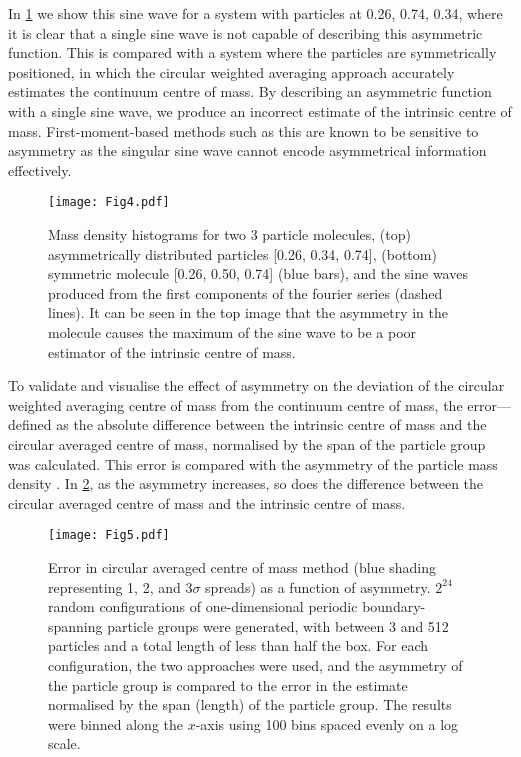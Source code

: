 \documentclass[reprint,superscriptaddress,nobibnotes,amsmath,amssymb,aip]{revtex4-2}
\begin{document}
In \cref{fig:sine_wave_assym} we show this sine wave for a system with particles at 0.26, 0.74, 0.34, where it is clear that a single sine wave is not capable of describing this asymmetric function. 
This is compared with a system where the particles are symmetrically positioned, in which the circular weighted averaging approach accurately estimates the continuum centre of mass. 
By describing an asymmetric function with a single sine wave, we produce an incorrect estimate of the intrinsic centre of mass. 
First-moment-based methods such as this are known to be sensitive to asymmetry \cite{teague_robust_2018} as the singular sine wave cannot encode asymmetrical information effectively. 
%
\begin{figure}
    \centering
    \texttt{[image: Fig4.pdf]}
    \caption{Mass density histograms for two 3 particle molecules, (top) asymmetrically distributed particles [0.26, 0.34, 0.74], (bottom) symmetric molecule [0.26, 0.50, 0.74] (blue bars), and the sine waves produced from the first components of the fourier series (dashed lines). It can be seen in the top image that the asymmetry in the molecule causes the maximum of the sine wave to be a poor estimator of the intrinsic centre of mass. }
    \label{fig:sine_wave_assym}
\end{figure}
%

To validate and visualise the effect of asymmetry on the deviation of the circular weighted averaging centre of mass from the continuum centre of mass, the error—defined as the absolute difference between the intrinsic centre of mass and the circular averaged centre of mass, normalised by the span of the particle group was calculated.
This error is compared with the asymmetry of the particle mass density \cite{xioajun_on_1991}. 
In \cref{fig:method_comparison}, as the asymmetry increases, so does the difference between the circular averaged centre of mass and the intrinsic centre of mass. 
%
\begin{figure}
    \centering
    \texttt{[image: Fig5.pdf]}
    \caption{Error in circular averaged centre of mass method (blue shading representing 1, 2, and 3$\sigma$ spreads) as a function of asymmetry.
    $2^{24}$ random configurations of one-dimensional periodic boundary-spanning particle groups were generated, with between 3 and 512 particles and a total length of less than half the box. 
    For each configuration, the two approaches were used, and the asymmetry of the particle group\cite{xioajun_on_1991} is compared to the error in the estimate normalised by the span (length) of the particle group. 
    The results were binned along the $x$-axis using 100 bins spaced evenly on a log scale.}
    \label{fig:method_comparison}
\end{figure}


\end{document}
